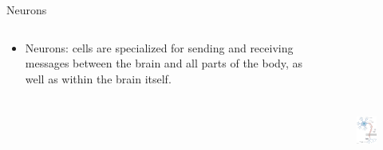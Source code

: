 \documentclass{beamer} %
\begin{document}
\begin{frame}{Neurons}
\begin{columns}
\begin{column}{0.5\textwidth}
\begin{itemize}
    \item Neurons: cells are specialized for sending and receiving messages between the brain and all parts of the body, as well as within the brain itself.
\end{itemize}
\end{column}
\begin{column}{0.45\textwidth}
\begin{figure}
    \includegraphics[width=\textwidth,height = 6cm]{531825569-1024x1024.jpg}
\end{figure}
\end{column}
\end{columns}
\end{frame}
\end{document}
